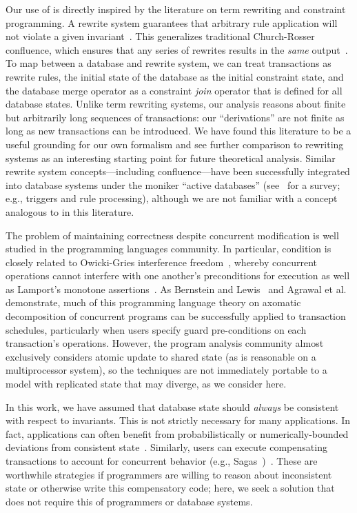  Our use of \iconfluence is directly inspired
by the literature on term rewriting and constraint programming. A
\iconfluent rewrite system guarantees that arbitrary rule application
will not violate a given invariant~\cite{obs-confluence}. This
generalizes traditional Church-Rosser confluence, which ensures that
any series of rewrites results in the \textit{same}
output~\cite{termrewriting}. To map between a database and rewrite
system, we can treat transactions as rewrite rules, the initial state
of the database as the initial constraint state, and the database
merge operator as a constraint \textit{join} operator that is defined
for all database states. Unlike term rewriting systems, our \cfreedom
analysis reasons about finite but arbitrarily long sequences of
transactions: our ``derivations'' are not finite as long as new
transactions can be introduced. We have found this literature to be a
useful grounding for our own formalism and see further comparison to
rewriting systems as an interesting starting point for future
theoretical analysis. Similar rewrite system concepts---including
confluence---have been successfully integrated into database systems
under the moniker ``active databases'' (see~\cite{activedb-book}
for a survey; e.g., triggers and rule processing), although we are not
familiar with a concept analogous to \iconfluence in this literature.

 The problem of maintaining correctness
despite concurrent modification is well studied in the programming
languages community. In particular, \iconfluence condition is closely
related to Owicki-Gries interference
  freedom~\cite{owickigries}, whereby concurrent operations cannot
interfere with one another's preconditions for execution as well as
Lamport's monotone assertions~\cite{lamport-safety}. As
Bernstein and Lewis~\cite{decomp-semantics} and Agrawal et
al.~\cite{agarwal-consistency} demonstrate, much of this programming
language theory on axomatic decomposition of concurrent programs can
be successfully applied to transaction schedules, particularly when
users specify guard pre-conditions on each transaction's
operations. However, the program analysis community almost exclusively
considers atomic update to shared state (as is reasonable on a
multiprocessor system), so the techniques are not immediately portable
to a model with replicated state that may diverge, as we consider
here.

 In this work, we have assumed that
database state should \textit{always} be consistent with respect to
invariants. This is not strictly necessary for many applications. In
fact, applications can often benefit from probabilistically or
numerically-bounded deviations from consistent
state~\cite{epsilon-divergence}. Similarly, users can execute
compensating transactions to account for concurrent behavior (e.g.,
Sagas~\cite{sagas})~\cite{ic-survey,ic-survey-two}. These are worthwhile
strategies if programmers are willing to reason about inconsistent
state or otherwise write this compensatory code; here,
we seek a solution that does not require this of programmers or
database systems.

